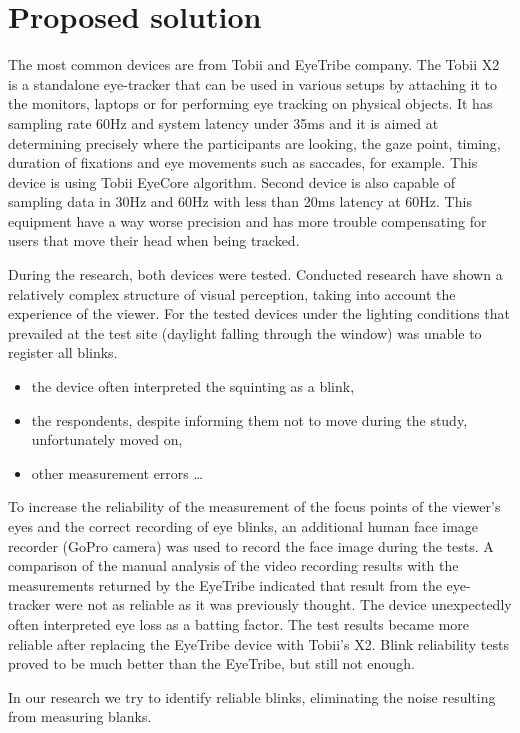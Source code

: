 \documentclass[runningheads,a4paper]{llncs}
\begin{document}
\section{Proposed solution}
The most common devices are from Tobii and EyeTribe company. 
The Tobii X2 is a standalone eye-tracker that can be used in various setups by attaching it to the monitors, laptops or for performing eye tracking on physical objects. It has sampling rate 60Hz and system latency under 35ms and it is aimed at determining precisely where the participants are looking, the gaze point, timing, duration of fixations and eye movements such as saccades, for example. This device is using Tobii EyeCore algorithm. 
Second device is also capable of sampling data in 30Hz and 60Hz with less than 20ms latency at 60Hz. This equipment have a way worse precision and has more trouble compensating for users that move their head when being tracked. 
\newline\par
During the research, both devices were tested.
Conducted research have shown a relatively complex structure of visual perception, taking into account the experience of the viewer.
For the tested devices under the lighting conditions that prevailed at the test site (daylight falling through the window) was unable to register all blinks.

\begin{itemize}
  \item the device often interpreted the squinting as a blink,
  \item the respondents, despite informing them not to move during the study, unfortunately moved on,
  \item other measurement errors \ldots
\end{itemize}

To increase the reliability of the measurement of the focus points of the viewer's eyes and the correct recording of eye blinks, an additional human face image recorder (GoPro camera) was used to record the face image during the tests.
A comparison of the manual analysis of the video recording results with the measurements returned by the EyeTribe indicated that  result from the eye-tracker were not as reliable as it was previously thought. The device unexpectedly often interpreted eye loss as a batting factor. The test results became more reliable after replacing the EyeTribe device with Tobii's X2. Blink reliability tests proved to be much better than the EyeTribe, but still not enough.

In our research we try to identify reliable blinks, eliminating the noise resulting from measuring blanks.






\end{document}
